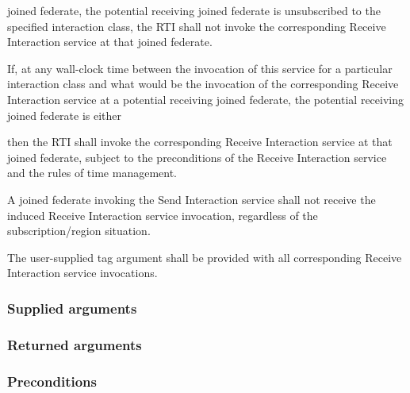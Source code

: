 \begin{compactstdpage}

    joined federate, the potential receiving joined federate is unsubscribed to the specified interaction class, the RTI shall not invoke the corresponding Receive Interaction \rtiinitiated{} service at that joined federate.


    If, at any wall-clock time between the invocation of this service for a particular interaction class and what would be the invocation of the corresponding Receive Interaction \rtiinitiated{} service at a potential receiving joined federate, the potential receiving joined federate is either




    then the RTI shall invoke the corresponding Receive Interaction \rtiinitiated{} service at that joined federate, subject to the preconditions of the Receive Interaction \rtiinitiated{} service and the rules of time management.


    A joined federate invoking the Send Interaction service shall not receive the induced Receive Interaction \rtiinitiated{} service invocation, regardless of the subscription/region situation.


    The user-supplied tag argument shall be provided with all corresponding Receive Interaction \rtiinitiated{} service invocations.

    \subsubsection{Supplied arguments}



    \subsubsection{Returned arguments}



    \subsubsection{Preconditions}



\end{compactstdpage}
